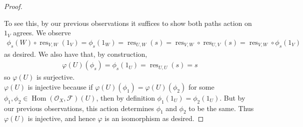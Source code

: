 \documentclass{article}
\newcommand{\fF}{\mathscr{F}}
\newcommand{\fO}{\mathscr{O}}
\DeclareMathOperator{\res}{\mathrm{res}}
\DeclareMathOperator{\Hom}{\mathrm{Hom}}
\begin{document}
\begin{proof}
\begin{center}
    \end{center}
    To see this, by our previous observations it suffices to show both paths action on $1_V$ agrees. We observe
    \begin{align*}
        \phi_s(W)\circ \res_{V,W}(1_V)=\phi_s(1_W)=\res_{U,W}(s)=\res_{V,W}\circ \res_{U,V}(s)=\res_{V,W}\circ \phi_s(1_V)
    \end{align*}
    as desired. We also have that, by construction,
    \begin{align*}
        \varphi(U)(\phi_s)=\phi_s(1_U)=\res_{U,U}(s)=s
    \end{align*}
    so $\varphi(U)$ is surjective.\\
    $\varphi(U)$ is injective because if $\varphi(U)(\phi_1)=\varphi(U)(\phi_2)$ for some $\phi_1,\phi_2\in \Hom(\fO_X,\fF)(U)$, then by definition $\phi_1(1_U)=\phi_2(1_U)$. But by our previous observations, this action determines $\phi_1$ and $\phi_2$ to be the same. Thus $\varphi(U)$ is injective, and hence $\varphi$ is an isomorphism as desired.
\end{proof}
\end{document}
